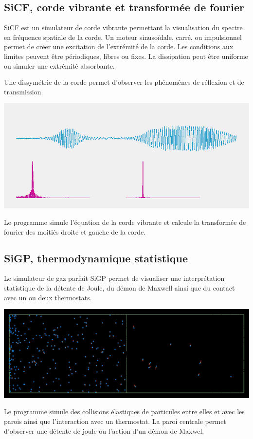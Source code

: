 \subsection{SiCF, corde vibrante et transformée de fourier}
%
SiCF est un simulateur de corde vibrante permettant la visualisation du spectre en fréquence spatiale de la corde. Un moteur sinusoïdale, carré, ou impulsionnel permet de créer une excitation de l'extrémité de la corde. Les conditions aux limites peuvent être périodiques, libres ou fixes. La dissipation peut être uniforme ou simuler une extrémité absorbante.

Une dissymétrie de la corde permet d'observer les phénomènes de réflexion et de transmission.

\begin{center}
\includegraphics[scale=0.51]{./titre/heisenberg2}
\end{center}
%
Le programme simule l'équation de la corde vibrante et calcule la transformée de fourier des moitiés droite et gauche de la corde.

%
\subsection{SiGP, thermodynamique statistique}
%
Le simulateur de gaz parfait SiGP permet de visualiser une interprétation statistique de la détente de Joule, du démon de Maxwell ainsi que du contact avec un ou deux thermostats.
%
\begin{center}
\includegraphics[scale=0.41]{./titre/SiGP}
\end{center}
%
Le programme simule des collisions élastiques de particules entre elles et avec les parois ainsi que l'interaction avec un thermostat.
%
La paroi centrale permet d'observer une détente de joule ou l'action d'un démon de Maxwel.
%
